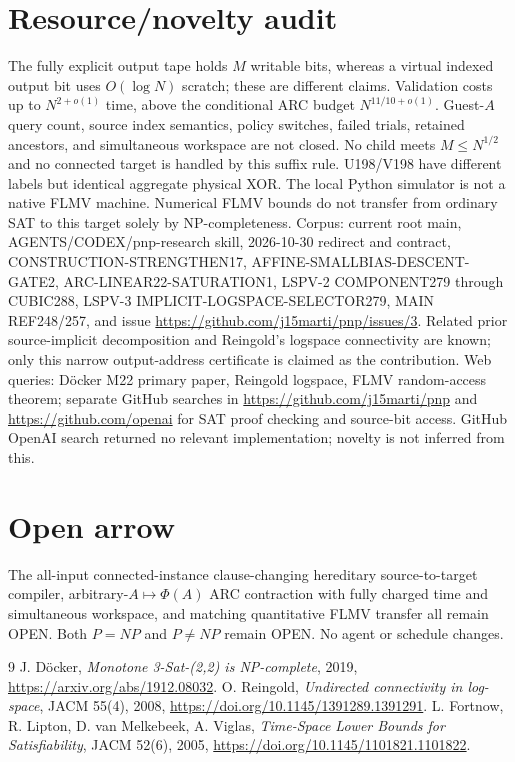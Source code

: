 \documentclass[11pt]{article}
\begin{document}
\section{Resource/novelty audit}
The fully explicit output tape holds $M$ writable bits, whereas a virtual indexed output bit uses $O(\log N)$ scratch; these are different claims. Validation costs up to $N^{2+o(1)}$ time, above the conditional ARC budget $N^{11/10+o(1)}$. Guest-$A$ query count, source index semantics, policy switches, failed trials, retained ancestors, and simultaneous workspace are not closed. No child meets $M\le N^{1/2}$ and no connected target is handled by this suffix rule. U198/V198 have different labels but identical aggregate physical XOR. The local Python simulator is not a native FLMV machine. Numerical FLMV bounds do not transfer from ordinary SAT to this target solely by NP-completeness.
Corpus: current root main, AGENTS/CODEX/pnp-research skill, 2026-10-30 redirect and contract, CONSTRUCTION-STRENGTHEN17, AFFINE-SMALLBIAS-DESCENT-GATE2, ARC-LINEAR22-SATURATION1, LSPV-2 COMPONENT279 through CUBIC288, LSPV-3 IMPLICIT-LOGSPACE-SELECTOR279, MAIN REF248/257, and issue \url{https://github.com/j15marti/pnp/issues/3}. Related prior source-implicit decomposition and Reingold's logspace connectivity are known; only this narrow output-address certificate is claimed as the contribution. Web queries: D\"ocker M22 primary paper, Reingold logspace, FLMV random-access theorem; separate GitHub searches in \url{https://github.com/j15marti/pnp} and \url{https://github.com/openai} for SAT proof checking and source-bit access. GitHub OpenAI search returned no relevant implementation; novelty is not inferred from this.
\section{Open arrow}
The all-input connected-instance clause-changing hereditary source-to-target compiler, arbitrary-$A\mapsto\Phi(A)$ ARC contraction with fully charged time and simultaneous workspace, and matching quantitative FLMV transfer all remain OPEN. Both $P=NP$ and $P\ne NP$ remain OPEN. No agent or schedule changes.
\begin{thebibliography}{9}
 J. D\"ocker, \emph{Monotone 3-Sat-(2,2) is NP-complete}, 2019, \url{https://arxiv.org/abs/1912.08032}.
 O. Reingold, \emph{Undirected connectivity in log-space}, JACM 55(4), 2008, \url{https://doi.org/10.1145/1391289.1391291}.
 L. Fortnow, R. Lipton, D. van Melkebeek, A. Viglas, \emph{Time-Space Lower Bounds for Satisfiability}, JACM 52(6), 2005, \url{https://doi.org/10.1145/1101821.1101822}.
\end{thebibliography}
\end{document}
